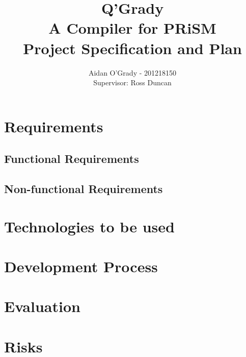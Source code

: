 \documentclass[11pt, a4paper]{article}
\begin{document}
\title{Q'Grady \\A Compiler for PRiSM \\
\large{Project Specification and Plan}}
\author{Aidan O'Grady - 201218150\\Supervisor: Ross Duncan}
\date{}
\maketitle

\section{Requirements} %
\label{sec:requirements}

\subsection{Functional Requirements} %
\label{sub:functional_requirements}


\subsection{Non-functional Requirements} %
\label{sub:non_functional_requirements}



\section{Technologies to be used} %
\label{sec:technologies_to_be_used}


\section{Development Process} %
\label{sec:development_process}


\section{Evaluation} %
\label{sec:evaluation}


\section{Risks} %
\label{sec:risks}

\end{document}
